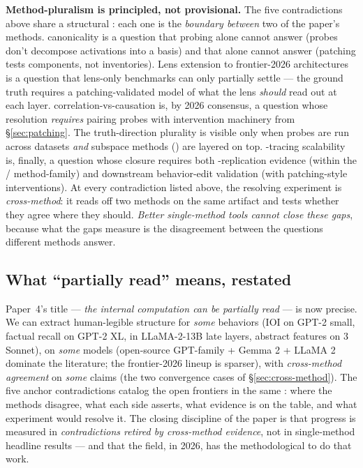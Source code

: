 \begin{contradiction}
\textbf{Method-pluralism is principled, not provisional.} The five
contradictions above share a structural : each one is the
\emph{boundary between} two of the paper's methods.  canonicality
is a question that probing alone cannot answer (probes don't decompose
activations into a basis) and that  alone cannot
answer (patching tests components, not  inventories). Lens
extension to frontier-2026 architectures is a question that lens-only
benchmarks can only partially settle --- the ground truth requires a
patching-validated model of what the lens \emph{should} read out at
each layer.  correlation-vs-causation is, by 2026 consensus, a
question whose resolution \emph{requires} pairing probes with
intervention machinery from \S\ref{sec:patching}. The truth-direction
plurality is visible only when probes are run across datasets
\emph{and} subspace methods (\citet{vennemeyer2025-sycophancy-not-one-thing})
are layered on top. -tracing scalability is, finally, a question
whose closure requires both -replication evidence (within
the / method-family) and downstream behavior-edit
validation (with patching-style interventions). At every contradiction
listed above, the resolving experiment is \emph{cross-method}: it
reads off two methods on the same artifact and tests whether they
agree where they should. \emph{Better single-method tools cannot
close these gaps}, because what the gaps measure is the disagreement
between the questions different methods answer.
\end{contradiction}

\subsection{What ``partially read'' means, restated}
\label{sec:contradictions-partially-read}

Paper~4's title --- \emph{the internal computation can be partially
read} --- is now precise. We can extract human-legible structure for
\emph{some} behaviors (IOI on GPT-2 small, factual recall on GPT-2 XL,
 in LLaMA-2-13B late layers, abstract features on
 3 Sonnet), on \emph{some} models (open-source GPT-family +
Gemma 2 + LLaMA 2 dominate the literature; the frontier-2026 lineup is
sparser), with \emph{cross-method agreement} on \emph{some} claims (the
two convergence cases of \S\ref{sec:cross-method}). The five anchor
contradictions catalog the open frontiers in the same :
where the methods disagree, what each side asserts, what evidence is
on the table, and what experiment would resolve it. The closing
discipline of the paper is that progress is measured in
\emph{contradictions retired by cross-method evidence}, not in
single-method headline results --- and that the field, in 2026, has
the methodological  to do that work.

